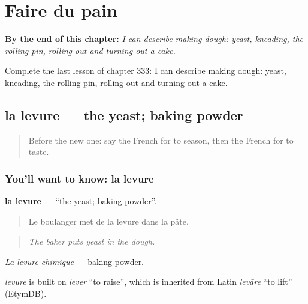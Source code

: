 
\chapter{Faire du pain}
\label{ch:fr-faire-du-pain}

\begin{chapteropening}
\textbf{By the end of this chapter:} \emph{I can describe making dough: yeast, kneading, the rolling pin, rolling out and turning out a cake.}

Complete the last lesson of chapter 333: I can describe making dough: yeast, kneading, the rolling pin, rolling out and turning out a cake.
\end{chapteropening}

\section[la levure]{la levure — the yeast; baking powder}

\label{lesson:FR-C333-levure}



\begin{quote}
Before the new one: say the French for to season, then the French for to taste.
\end{quote}

\subsection*{You'll want to know: la levure}
\textbf{la levure} — \textquotedblleft{}the yeast; baking powder\textquotedblright{}.

\begin{quote}
Le boulanger met de la levure dans la pâte.
\end{quote}

\begin{quote}
\emph{The baker puts yeast in the dough.}
\end{quote}

\emph{La levure chimique} — baking powder.

\begin{cousinweb}
\emph{levure} is built on \emph{lever} \textquotedblleft{}to raise\textquotedblright{}, which is inherited from Latin \emph{levāre} \textquotedblleft{}to lift\textquotedblright{} (EtymDB).
\end{cousinweb}

